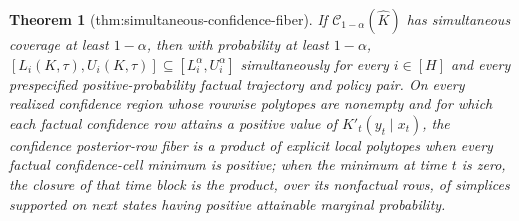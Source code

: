 \documentclass{article}
\newtheorem{theorem}{Theorem}
\begin{document}
\begin{theorem}[thm:simultaneous-confidence-fiber]\label{thm:simultaneous-confidence-fiber}
If \(\mathcal C_{1-\alpha}(\widehat K)\) has simultaneous coverage at least \(1-\alpha\), then with probability at least \(1-\alpha\), \([L_i(K,\tau),U_i(K,\tau)]\subseteq[L_i^{\alpha},U_i^{\alpha}]\) simultaneously for every \(i\in[H]\) and every prespecified positive-probability factual trajectory and policy pair. On every realized confidence region whose rowwise polytopes are nonempty and for which each factual confidence row attains a positive value of \(K'_t(y_t\mid x_t)\), the confidence posterior-row fiber is a product of explicit local polytopes when every factual confidence-cell minimum is positive; when the minimum at time \(t\) is zero, the closure of that time block is the product, over its nonfactual rows, of simplices supported on next states having positive attainable marginal probability.
\end{theorem}
\end{document}

